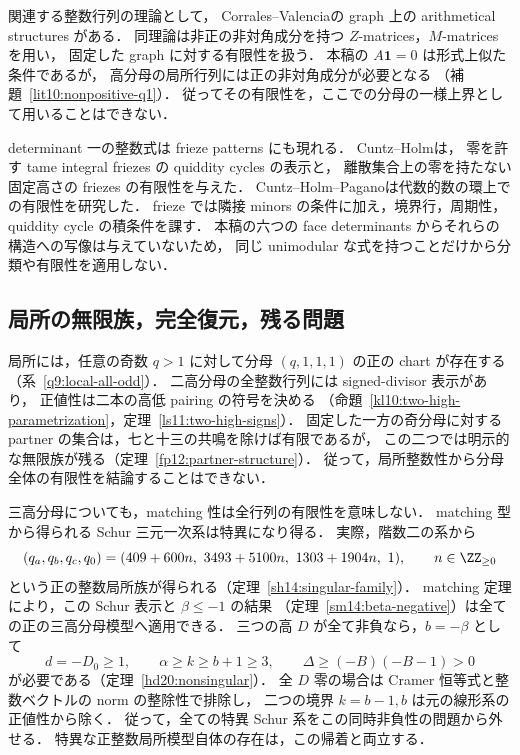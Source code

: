 関連する整数行列の理論として，
Corrales--Valencia\cite[\S\S2--3]{CorralesValencia}の graph 上の arithmetical structures がある．
同理論は非正の非対角成分を持つ $Z$-matrices，$M$-matrices を用い，
固定した graph に対する有限性を扱う．
本稿の $A\mathbf1=0$ は形式上似た条件であるが，
高分母の局所行列には正の非対角成分が必要となる
（補題~\ref{lit10:nonpositive-q1}）．
従ってその有限性を，ここでの分母の一様上界として用いることはできない．

determinant 一の整数式は frieze patterns にも現れる．
Cuntz--Holm\cite[\S\S2--3 and~7]{CuntzHolmFriezes}は，
零を許す tame integral friezes の quiddity cycles の表示と，
離散集合上の零を持たない固定高さの friezes の有限性を与えた．
Cuntz--Holm--Pagano\cite{CuntzHolmPagano}は代数的数の環上での有限性を研究した．
frieze では隣接 minors の条件に加え，境界行，周期性，quiddity cycle の積条件を課す．
本稿の六つの face determinants からそれらの構造への写像は与えていないため，
同じ unimodular な式を持つことだけから分類や有限性を適用しない．

\subsection{局所の無限族，完全復元，残る問題}

局所には，任意の奇数 $q>1$ に対して分母 $(q,1,1,1)$ の正の chart が存在する
（系~\ref{q9:local-all-odd}）．
二高分母の全整数行列には signed-divisor 表示があり，
正値性は二本の高低 pairing の符号を決める
（命題~\ref{kl10:two-high-parametrization}，定理~\ref{ls11:two-high-signs}）．
固定した一方の奇分母に対する partner の集合は，七と十三の共鳴を除けば有限であるが，
この二つでは明示的な無限族が残る（定理~\ref{fp12:partner-structure}）．
従って，局所整数性から分母全体の有限性を結論することはできない．

三高分母についても，matching 性は全行列の有限性を意味しない．
matching 型から得られる Schur 三元一次系は特異になり得る．
実際，階数二の系から
\[
 (q_a,q_b,q_c,q_0)
 =(409+600n,\ 3493+5100n,\ 1303+1904n,\ 1),
 \qquad n\in\ZZ_{\ge0}
\]
という正の整数局所族が得られる（定理~\ref{sh14:singular-family}）．
matching 定理により，この Schur 表示と $\beta\le-1$ の結果
（定理~\ref{sm14:beta-negative}）は全ての正の三高分母模型へ適用できる．
三つの高 $D$ が全て非負なら，$b=-\beta$ として
\[
 d=-D_0\ge1,\qquad \alpha\ge k\ge b+1\ge3,
 \qquad \Delta\ge(-B)(-B-1)>0
\]
が必要である（定理~\ref{hd20:nonsingular}）．
全 $D$ 零の場合は Cramer 恒等式と整数ベクトルの norm の整除性で排除し，
二つの境界 $k=b-1,b$ は元の線形系の正値性から除く．
従って，全ての特異 Schur 系をこの同時非負性の問題から外せる．
特異な正整数局所模型自体の存在は，この帰着と両立する．

